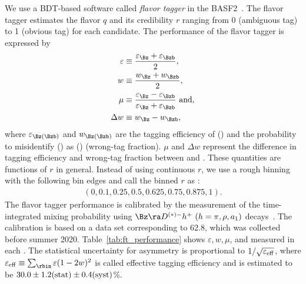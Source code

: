 We use a BDT-based software called \textit{flavor tagger} in the BASF2~\cite{Belle-II:flavortag}.
The flavor tagger estimates the flavor $q$ and its credibility $r$ ranging from 0 (ambiguous tag) to 1 (obvious tag) for each \Btag candidate.
The performance of the flavor tagger is expressed by
\begin{align}
    \varepsilon &\equiv \frac{\varepsilon_{\Bz} + \varepsilon_{\Bzb}}{2},\\
     w &\equiv \frac{w_{\Bz} + w_{\Bzb}}{2},\\
    \mu &\equiv \frac{\varepsilon_{\Bz} - \varepsilon_{\Bzb}}{\varepsilon_{\Bz} + \varepsilon_{\Bzb}} {\rm \ and},\\
    \Delta w &\equiv w_{\Bz} - w_{\Bzb},
\end{align}
where $\varepsilon_{\Bz(\Bzb)}$ and $w_{\Bz(\Bzb)}$ are the tagging efficiency of \Bz(\Bzb) and the probability to misidentify \Bz(\Bzb) as \Bzb(\Bz) (wrong-tag fraction). 
$\mu$ and $\Delta w$ represent the difference in tagging efficiency and wrong-tag fraction between \Bz and \Bzb.
These quantities are functions of $r$ in general.
Instead of using continuous $r$, we use a rough binning with the following bin edges and call the binned $r$ as \rbin:
\begin{align}
(0, 0.1,0.25,0.5,0.625,0.75,0.875,1).    
\end{align}
The flavor tagger performance is calibrated by the measurement of the time-integrated mixing probability using $\Bz \ra D^{(*)-} h^+ \ (h=\pi, \rho, a_1)$ decays~\cite{Belle-II:flavortag}.
The calibration is based on a data set corresponding to 62.8\invfb, which was collected before summer 2020.
Table~\ref{tab:ft_performance} shows $\varepsilon, w, \mu$, and \dw measured in each \rbin.
The statistical uncertainty for \cp asymmetry is proportional to $1/\sqrt{\varepsilon_{\rm eff}}$, where $\varepsilon_{\rm eff}\equiv\sum_{\rbin}\varepsilon(1-2w)^2$ is called effective tagging efficiency and is estimated to be $30.0 \pm 1.2 {\rm(stat)} \pm 0.4 ({\rm syst})$\%.

